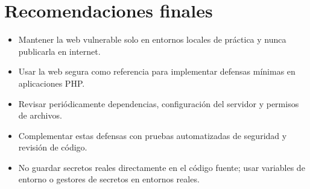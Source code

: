 \documentclass[12pt,a4paper]{article}
\begin{document}
\section{Recomendaciones finales}

\begin{itemize}[leftmargin=*]
    \item Mantener la web vulnerable solo en entornos locales de práctica y nunca publicarla en internet.
    \item Usar la web segura como referencia para implementar defensas mínimas en aplicaciones PHP.
    \item Revisar periódicamente dependencias, configuración del servidor y permisos de archivos.
    \item Complementar estas defensas con pruebas automatizadas de seguridad y revisión de código.
    \item No guardar secretos reales directamente en el código fuente; usar variables de entorno o gestores de secretos en entornos reales.
\end{itemize}
\end{document}
